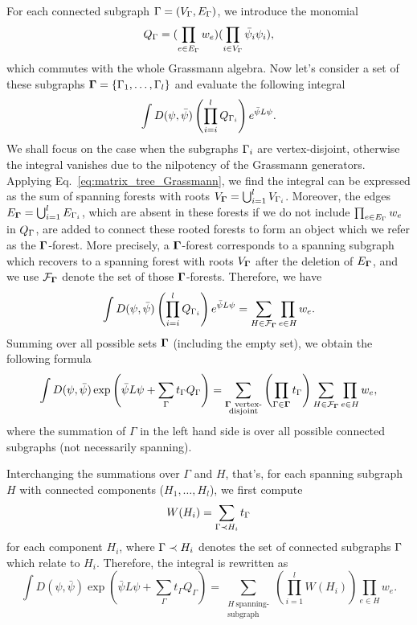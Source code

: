 For each connected subgraph ${\Gamma} = (V_{{\Gamma}}, E_{{\Gamma}})$, we introduce the monomial 
\begin{equation}
	Q_{{\Gamma}} = (\prod_{e\in E_{\Gamma}}w_e)(\prod_{i\in V_{{\Gamma}}}\bar{{\psi}}_i {\psi}_i),
\end{equation}
which commutes with the whole Grassmann algebra. Now let's consider a set of these subgraphs $\bm{\Gamma} = \{{\Gamma}_1, \dots, {\Gamma}_l\}$ and
evaluate the following integral
\begin{equation}
	\int D({\psi}, \bar{{\psi}}) \left(\prod_{i=i}^l Q_{{\Gamma}_i}\right) e^{\bar{{\psi}} L {\psi}}.
\end{equation}
We shall focus on the case when the subgraphs ${\Gamma}_i$ are vertex-disjoint, otherwise the integral vanishes due to the nilpotency of the Grassmann generators.
Applying Eq.~\eqref{eq:matrix_tree_Grassmann}, we find the integral can be expressed as the sum of spanning forests with roots $V_{\bm{\Gamma}} = \bigcup_{i=1}^{l} V_{{\Gamma}_i}$.
Moreover, the edges $E_{\bm{\Gamma}} = \bigcup_{i=1}^l E_{{\Gamma}_i}$, which are absent in these forests if we do not include $\prod_{e\in E_{{\Gamma}}} w_e$ in $Q_{{\Gamma}}$, are added to
connect these rooted forests to form an object which we refer as the $\bm{{\Gamma}}$-forest. More precisely, a $\bm{{\Gamma}}$-forest corresponds to a spanning subgraph which recovers
to a spanning forest with roots $V_{\bm {{\Gamma}}}$ after the deletion of $E_{\bm{{\Gamma}}}$, and we use ${\mathcal F}_{\bm{{\Gamma}}}$ denote the set of those $\bm{{\Gamma}}$-forests. Therefore, we have
\begin{equation}
	\int D({\psi}, \bar{{\psi}}) \left(\prod_{i=i}^l Q_{{\Gamma}_i}\right) e^{\bar{{\psi}} L {\psi}} = \sum_{H \in {\mathcal F}_{\bm{\Gamma}}} \prod_{e\in H} w_e.
\end{equation} 
Summing over all possible sets $\bm{{\Gamma}}$ (including the empty set), we obtain the following formula
\begin{equation}
	\int D(\psi, \bar{\psi}) \exp\left(\bar{\psi} L \psi+\sum_{\Gamma} t_{\Gamma} Q_{\Gamma}\right)=
	\sum_{\substack{\bm{{\Gamma}}\  \text{vertex-}\\ \text{disjoint}} }\left(\prod_{\Gamma \in {\bm{\Gamma}}} t_{\Gamma}\right) \sum_{H \in \mathcal{F}_{\bm{{\Gamma}}}} \prod_{e \in H} w_{e},
\end{equation}
where the summation of $\Gamma$ in the left hand side is over all possible connected subgraphs (not necessarily spanning).

Interchanging the summations over $\Gamma$ and $H$, that's, for each spanning subgraph $H$ with connected components ($H_1, \dots, H_l$), 
we first compute
\begin{equation}
	W(H_i) = \sum_{{\Gamma} \prec H_i} t_{{\Gamma}}
\end{equation}
for each component $H_i$, where ${\Gamma} \prec H_i$ denotes the set of connected subgraphs ${\Gamma}$ which relate to $H_i$.
Therefore, the integral is rewritten as
\begin{equation}
	\int D(\psi, \bar{\psi}) \exp\left(\bar{\psi} L \psi+\sum_{\Gamma} t_{\Gamma} Q_{\Gamma}\right)=
	\sum_{\substack{H\ \text{spanning-}\\ \text{subgraph}}} \left(\prod_{i=1}^l W(H_i)\right) \prod_{e \in H} w_{e}.
\end{equation}

